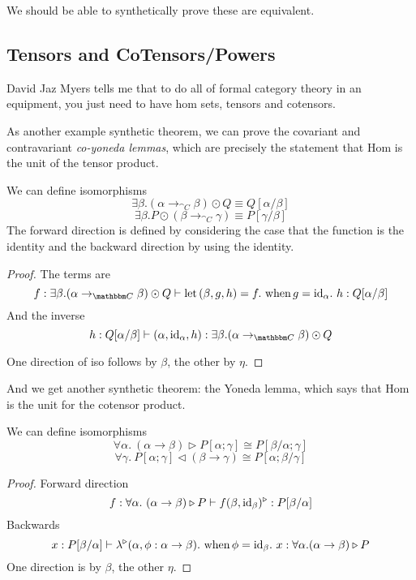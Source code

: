 \documentclass{article}
\begin{document}
We should be able to synthetically prove these are equivalent.

\subsection{Tensors and CoTensors/Powers}

David Jaz Myers tells me that to do all of formal category theory in
an equipment, you just need to have hom sets, tensors and cotensors.

As another example synthetic theorem, we can prove the covariant and
contravariant \emph{co-yoneda lemmas}, which are precisely the
statement that Hom is the unit of the tensor product.
\begin{lemma}[CoYoneda]
  We can define isomorphisms
  \[ \exists \beta. (\alpha \to_{\cat C} \beta) \odot Q \equiv Q[\alpha/\beta] \]
  \[ \exists \beta. P \odot (\beta \to_{\cat C} \gamma) \equiv P[\gamma/\beta] \]
  The forward direction is defined by considering the case that the
  function is the identity and the backward direction by using the
  identity.
\end{lemma}
\begin{proof}
  The terms are
  \[ f : \exists \beta. (\alpha\to_{\cat C} \beta) \odot Q \vdash
  \lett (\beta,g,h) = f.~ \when g = \id_{\alpha}.~ h : Q[\alpha/\beta]
  \]
  And the inverse
  \[ h : Q[\alpha/\beta] \vdash (\alpha, \id_{\alpha}, h) : \exists \beta. (\alpha\to_{\cat C}\beta)\odot Q\]

  One direction of iso follows by $\beta$, the other by $\eta$.
\end{proof}

And we get another synthetic theorem: the Yoneda lemma, which says
that Hom is the unit for the cotensor product.
\begin{lemma}
  We can define isomorphisms
  \[ \forall \alpha.~ (\alpha \to \beta) \triangleright P[\alpha;\gamma] \cong P[\beta/\alpha;\gamma] \]
  \[ \forall \gamma.~ P[\alpha;\gamma] \triangleleft (\beta \to \gamma) \cong P[\alpha;\beta/\gamma]\]
\end{lemma}
\begin{proof}
  Forward direction
  \[ f : \forall \alpha.~(\alpha\to\beta)\triangleright P \vdash
  f(\beta,\textrm{id}_{\beta})^\triangleright : P[\beta/\alpha]
  \]
  Backwards
  \[ x : P[\beta/\alpha]\vdash
  \lambda^\triangleright(\alpha,\phi : \alpha \to \beta).~\textrm{when}\, \phi = \textrm{id}_{\beta}.~ x : \forall \alpha. (\alpha\to \beta) \triangleright P
  \]
  One direction is by $\beta$, the other $\eta$.
\end{proof}
\end{document}
